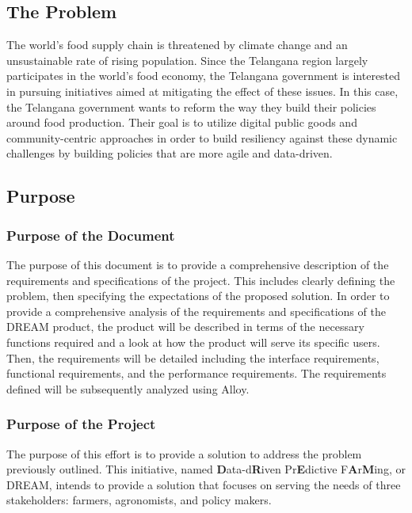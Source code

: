 \setcounter{goals_counter}{1}
\subsection{The Problem}
\begin{flushleft}
The world's food supply chain is threatened by climate change and an unsustainable rate of rising population. Since the Telangana region largely participates in the world's food economy, the Telangana government is interested in pursuing initiatives aimed at mitigating the effect of these issues. In this case, the Telangana government wants to reform the way they build their policies around food production. Their goal is to utilize digital public goods and community-centric approaches in order to build resiliency against these dynamic challenges by building policies that are more agile and data-driven. 

\subsection{Purpose}
\subsubsection{Purpose of the Document}
The purpose of this document is to provide a comprehensive description of the requirements and specifications of the project. This includes clearly defining the problem, then specifying the expectations of the proposed solution. In order to provide a comprehensive analysis of the requirements and specifications of the DREAM product, the product will be described in terms of the necessary functions required and a look at how the product will serve its specific users. Then, the requirements will be detailed including the interface requirements, functional requirements, and the performance requirements. The requirements defined will be subsequently analyzed using Alloy. 

\subsubsection{Purpose of the Project}
The purpose of this effort is to provide a solution to address the problem previously outlined. 
This initiative, named {\bf D}ata-d{\bf R}iven Pr{\bf E}dictive F{\bf A}r{\bf M}ing, or DREAM, intends to provide a solution that focuses on serving the needs of three stakeholders: farmers, agronomists, and policy makers. 
\smallskip \\


\end{flushleft}
